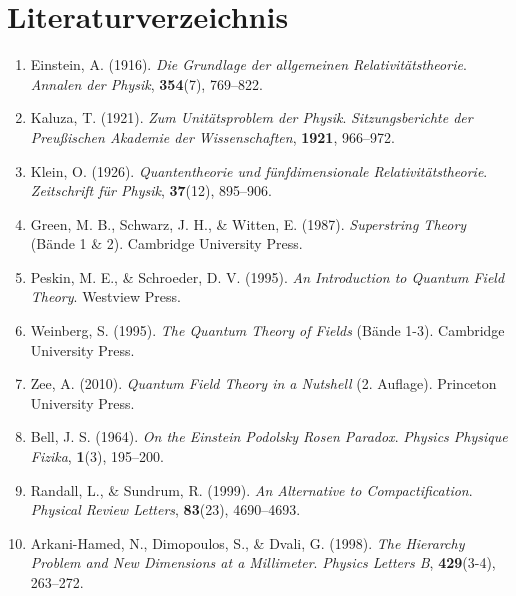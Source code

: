 \documentclass[11pt,a4paper]{article}
\begin{document}
\section*{Literaturverzeichnis}

\begin{enumerate}
    \item Einstein, A. (1916). \textit{Die Grundlage der allgemeinen Relativitätstheorie}. \textit{Annalen der Physik}, \textbf{354}(7), 769–822.
    \item Kaluza, T. (1921). \textit{Zum Unitätsproblem der Physik}. \textit{Sitzungsberichte der Preußischen Akademie der Wissenschaften}, \textbf{1921}, 966–972.
    \item Klein, O. (1926). \textit{Quantentheorie und fünfdimensionale Relativitätstheorie}. \textit{Zeitschrift für Physik}, \textbf{37}(12), 895–906.
    \item Green, M. B., Schwarz, J. H., \& Witten, E. (1987). \textit{Superstring Theory} (Bände 1 \& 2). Cambridge University Press.
    \item Peskin, M. E., \& Schroeder, D. V. (1995). \textit{An Introduction to Quantum Field Theory}. Westview Press.
    \item Weinberg, S. (1995). \textit{The Quantum Theory of Fields} (Bände 1-3). Cambridge University Press.
    \item Zee, A. (2010). \textit{Quantum Field Theory in a Nutshell} (2. Auflage). Princeton University Press.
    \item Bell, J. S. (1964). \textit{On the Einstein Podolsky Rosen Paradox}. \textit{Physics Physique Fizika}, \textbf{1}(3), 195–200.
    \item Randall, L., \& Sundrum, R. (1999). \textit{An Alternative to Compactification}. \textit{Physical Review Letters}, \textbf{83}(23), 4690–4693.
    \item Arkani-Hamed, N., Dimopoulos, S., \& Dvali, G. (1998). \textit{The Hierarchy Problem and New Dimensions at a Millimeter}. \textit{Physics Letters B}, \textbf{429}(3-4), 263–272.
\end{enumerate}
\end{document}
